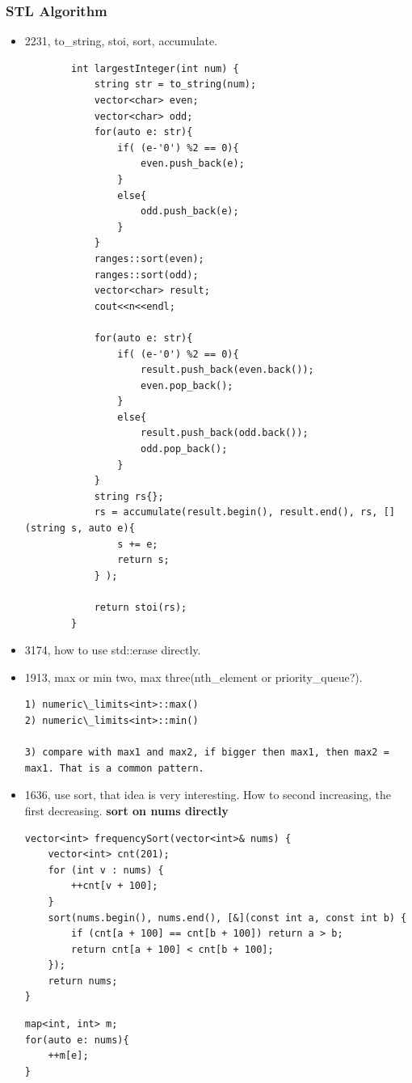 \documentclass[a4paper,11pt,twoside]{book}
\begin{document}
\subsubsection{STL Algorithm}
\begin{itemize}
	
	\item 2231,  to\_string, stoi, sort, accumulate.
	\begin{lstlisting}
		int largestInteger(int num) {
			string str = to_string(num);
			vector<char> even;
			vector<char> odd;
			for(auto e: str){
				if( (e-'0') %2 == 0){
					even.push_back(e);
				}
				else{
					odd.push_back(e);
				}
			}
			ranges::sort(even);
			ranges::sort(odd);
			vector<char> result;
			cout<<n<<endl;
			
			for(auto e: str){
				if( (e-'0') %2 == 0){
					result.push_back(even.back());
					even.pop_back();
				}
				else{
					result.push_back(odd.back());
					odd.pop_back();
				}
			}
			string rs{};
			rs = accumulate(result.begin(), result.end(), rs, [](string s, auto e){
				s += e;
				return s;
			} );
			
			return stoi(rs);
		}
	\end{lstlisting}
	
	
	\item 3174, how to use std::erase directly.
	
	\item 1913, max or min two, max three(nth\_element or priority\_queue?). 
\begin{lstlisting}
1) numeric\_limits<int>::max()
2) numeric\_limits<int>::min()

3) compare with max1 and max2, if bigger then max1, then max2 = max1. That is a common pattern. 
\end{lstlisting}

	\item 1636, use sort, that idea is very interesting. How to second increasing, the first decreasing.  \textbf{sort on nums directly}
\begin{lstlisting}
vector<int> frequencySort(vector<int>& nums) {
	vector<int> cnt(201);
	for (int v : nums) {
		++cnt[v + 100];
	}
	sort(nums.begin(), nums.end(), [&](const int a, const int b) {
		if (cnt[a + 100] == cnt[b + 100]) return a > b;
		return cnt[a + 100] < cnt[b + 100];
	});
	return nums;
}
\end{lstlisting}


\begin{lstlisting}
map<int, int> m;
for(auto e: nums){
	++m[e];
}


\end{lstlisting}
\end{itemize}
\end{document}
